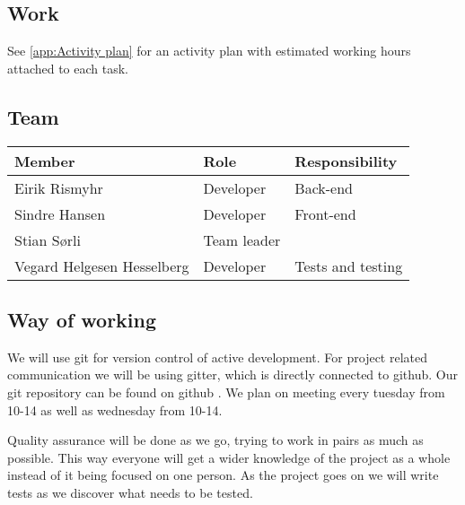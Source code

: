 \subsection{Work}
See \cref{app:Activity plan} for an activity plan with estimated working hours attached to each task. 

\subsection{Team}
\label{sec:Team}
\begin{adjustbox}{center}
\begin{tabular}{ l | l | l}
    Member & Role & Responsibility \\ \hline
    Eirik Rismyhr & Developer & Back-end\\ 
    Sindre Hansen & Developer & Front-end \\ 
    Stian Sørli & Team leader & \\ 
    Vegard Helgesen Hesselberg & Developer & Tests and testing\\ 
    
\end{tabular}
\end{adjustbox}


\subsection{Way of working}
We will use git for version control of active development. For project related communication we will be using gitter, which is directly connected to github. Our git repository can be found on github . We plan on meeting every tuesday from 10-14 as well as wednesday from 10-14.

Quality assurance will be done as we go, trying to work in pairs as much as possible. This way everyone will get a wider knowledge of the project as a whole instead of it being focused on one person. As the project goes on we will write tests as we discover what needs to be tested. 